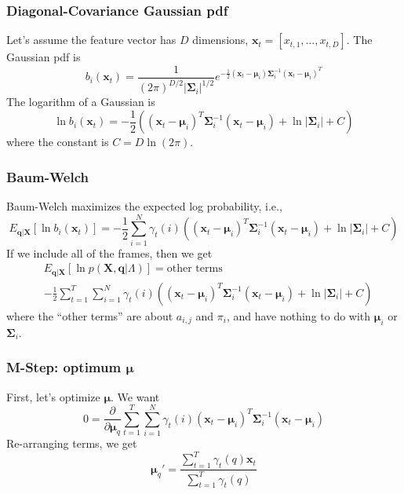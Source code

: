 \documentclass{beamer}
\begin{document}
\begin{frame}
  \frametitle{Diagonal-Covariance Gaussian pdf}

  Let's assume the feature vector has $D$ dimensions,
  $\mathbf{x}_t=[x_{t,1},\ldots,x_{t,D}]$.  The Gaussian pdf is
  \begin{displaymath}
    b_i(\mathbf{x}_t) = 
    \frac{1}{(2\pi)^{D/2}|\mathbf{\Sigma}_i|^{1/2}}e^{-\frac{1}{2}(\mathbf{x}_t-\bm{\mu}_i)\mathbf{\Sigma}_i^{-1}(\mathbf{x}_t-\bm{\mu}_i)^T}
  \end{displaymath}
  The logarithm of a Gaussian is
  \begin{displaymath}
    \ln b_i(\mathbf{x}_t)=
    -\frac{1}{2}\left((\mathbf{x}_t-\bm{\mu}_i)^T\mathbf{\Sigma}_i^{-1}(\mathbf{x}_t-\bm{\mu}_i)
    +\ln|\mathbf{\Sigma}_i| + C\right)
  \end{displaymath}
  where the constant is $C=D\ln(2\pi)$.
\end{frame}

\begin{frame}
  \frametitle{Baum-Welch}

  Baum-Welch maximizes the expected
  log probability, i.e.,
  \begin{displaymath}
    E_{\mathbf{q}|\mathbf{X}}\left[\ln b_i(\mathbf{x}_t)\right]=
    -\frac{1}{2}\sum_{i=1}^N \gamma_t(i)\left(
    (\mathbf{x}_t-\bm{\mu}_i)^T\mathbf{\Sigma}_i^{-1}(\mathbf{x}_t-\bm{\mu}_i)
    +\ln|\mathbf{\Sigma}_i|+C\right)
  \end{displaymath}
  If we include all of the frames, then we get
  \begin{align*}
    &E_{\mathbf{q}|\mathbf{X}}\left[\ln p(\mathbf{X},\mathbf{q}|\Lambda)\right] = \mbox{other terms}\\
    &-\frac{1}{2}\sum_{t=1}^T \sum_{i=1}^N \gamma_t(i)\left(
    (\mathbf{x}_t-\bm{\mu}_i)^T\mathbf{\Sigma}_i^{-1}(\mathbf{x}_t-\bm{\mu}_i)
    +\ln|\mathbf{\Sigma}_i|+C\right) 
  \end{align*}
  where the ``other terms'' are about $a_{i,j}$ and $\pi_i$, and have
  nothing to do with $\bm{\mu}_i$ or $\mathbf{\Sigma}_i$.
\end{frame}
  
\begin{frame}
  \frametitle{M-Step: optimum $\bm{\mu}$}

  First, let's optimize $\bm{\mu}$.  We want
  \begin{displaymath}
    0 = \frac{\partial}{\partial{\bm{\mu}_q}}\sum_{t=1}^T\sum_{i=1}^N\gamma_t(i)(\mathbf{x}_t-\bm{\mu}_i)^T\mathbf{\Sigma}_i^{-1}(\mathbf{x}_t-\bm{\mu}_i)
  \end{displaymath}
  Re-arranging terms, we get
  \begin{displaymath}
    \bm{\mu}_q' = \frac{\sum_{t=1}^T\gamma_t(q)\mathbf{x}_{t}}{\sum_{t=1}^T\gamma_t(q)}
  \end{displaymath}
\end{frame}
\end{document}

